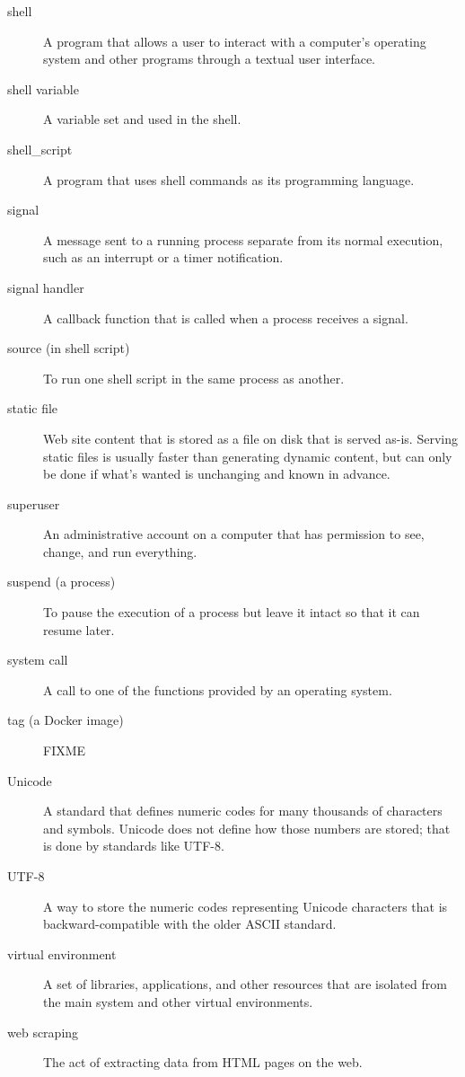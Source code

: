 \documentclass[krantzl]{krantz}
\begin{document}
\begin{description}
\item[shell] A program that allows a user to interact with a computer’s operating system and other programs through a textual user interface.

\item[shell variable] A variable set and used in the shell.

\item[shell\_script] A program that uses shell commands as its programming language.

\item[signal] A message sent to a running process separate from its normal execution, such as an interrupt or a timer notification.

\item[signal handler] A callback function that is called when a process receives a signal.

\item[source (in shell script)] To run one shell script in the same process as another.

\item[static file] Web site content that is stored as a file on disk that is served as-is. Serving static files is usually faster than generating dynamic content, but can only be done if what’s wanted is unchanging and known in advance.

\item[superuser] An administrative account on a computer that has permission to see, change, and run everything.

\item[suspend (a process)] To pause the execution of a process but leave it intact so that it can resume later.

\item[system call] A call to one of the functions provided by an operating system.

\item[tag (a Docker image)] FIXME

\item[Unicode] A standard that defines numeric codes for many thousands of characters and symbols. Unicode does not define how those numbers are stored; that is done by standards like UTF-8.

\item[UTF-8] A way to store the numeric codes representing Unicode characters that is backward-compatible with the older ASCII standard.

\item[virtual environment] A set of libraries, applications, and other resources that are isolated from the main system and other virtual environments.

\item[web scraping] The act of extracting data from HTML pages on the web.

\end{description}
\end{document}
